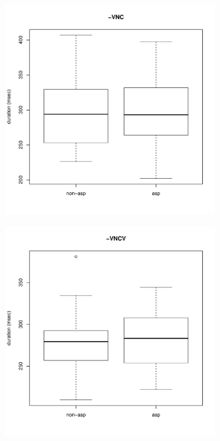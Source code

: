 \documentclass[11pt,a4paper,openany]{memoir}\usepackage[]{graphicx}\usepackage[]{color}
\newenvironment{knitrout}{}{} %
\begin{document}
\begin{figure}
\begin{subfigure}{.5\textwidth}
\begin{knitrout}
\end{knitrout}
\end{subfigure}
\begin{subfigure}{.5\textwidth}
\centering
\begin{knitrout}
\color{fgcolor}
\includegraphics[width=\textwidth]{img/mono-nas-vor-1} 

\end{knitrout}
\end{subfigure}
\begin{subfigure}{.5\textwidth}
\centering
\begin{knitrout}
\color{fgcolor}
\includegraphics[width=\textwidth]{img/di-nas-vor-1} 


\end{knitrout}
\end{subfigure}
\end{figure}
\end{document}
